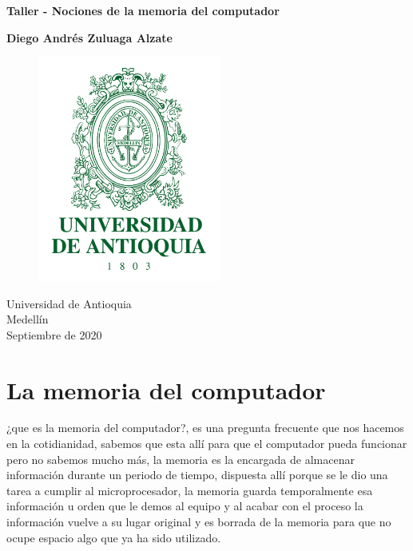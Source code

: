 \documentclass{article}
\begin{document}
\begin{titlepage}
    \begin{center}
        \vspace*{1cm}
            
        \Huge
        \textbf{Taller - Nociones de la memoria del computador}
            
        \vspace{1.5cm}
        
        \textbf{Diego Andrés Zuluaga Alzate}
        
        \vspace{1.5cm}
        
        \begin{figure}[h]
        \includegraphics[width=6cm]{logoudea.png}
        \centering
        \label{fig:logoudea}
        \end{figure}
            
        \vspace{0.7cm}
            
        \Large
        Universidad de Antioquia\\
        Medellín\\
        Septiembre de 2020
            
    \end{center}
\end{titlepage}

\tableofcontents

\section{La memoria del computador}
¿que es la memoria del computador?, es una pregunta frecuente que nos hacemos en la cotidianidad, sabemos que esta allí para que el computador pueda funcionar pero no sabemos mucho más, la memoria es la encargada de almacenar información durante un periodo de tiempo, dispuesta allí porque se le dio una tarea a cumplir al microprocesador, la memoria guarda temporalmente esa información u orden que le demos al equipo y al acabar con el proceso  la información vuelve a su lugar original  y es borrada de la memoria para que no ocupe espacio algo que ya ha sido utilizado.\cite{memoria}
 
\end{document}
